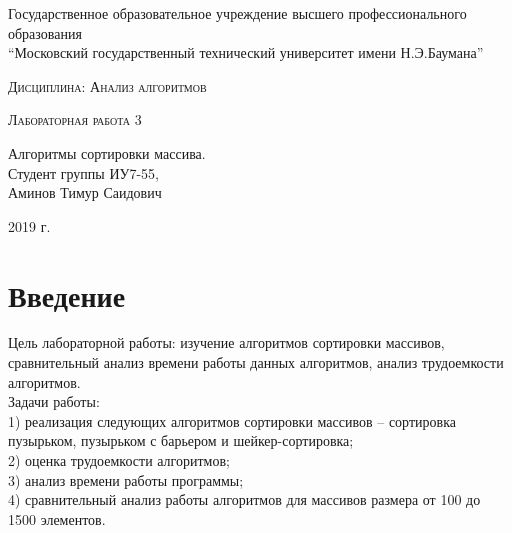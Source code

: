 \documentclass[a4paper, 14pt]{article}
\begin{document}
    \begin{titlepage}

        \begin{center}
            \large
            Государственное образовательное учреждение высшего профессионального образования\\
            “Московский государственный технический университет имени Н.Э.Баумана”
            \vspace{3cm}
            
            \textsc{Дисциплина: Анализ алгоритмов}
            \vspace{0.5cm}
                
            \textsc{Лабораторная работа 3}
            \vspace{1.5cm}
            
            {\LARGE Алгоритмы сортировки массива.\\}
            \vspace{1.5cm}
            Студент группы ИУ7-55,\\   
            Аминов Тимур Саидович
            \vfill
            
            2019 г.
            
            \end{center}

    \end{titlepage}
    
\tableofcontents
	\setcounter{page}{2}
	\newpage
	
        \section*{Введение}
        Цель лабораторной работы: изучение алгоритмов сортировки массивов, сравнительный анализ времени работы данных алгоритмов, анализ трудоемкости алгоритмов.\\
Задачи работы:\\
1) реализация следующих алгоритмов сортировки массивов –  сортировка пузырьком, пузырьком с барьером и шейкер-сортировка;\\
2) оценка трудоемкости алгоритмов;\\
3) анализ времени работы программы;\\
4) сравнительный анализ работы алгоритмов для массивов размера от 100 до 1500 элементов.

        \parindent=1cm
		

        \label{sec:intro}
\end{document}
